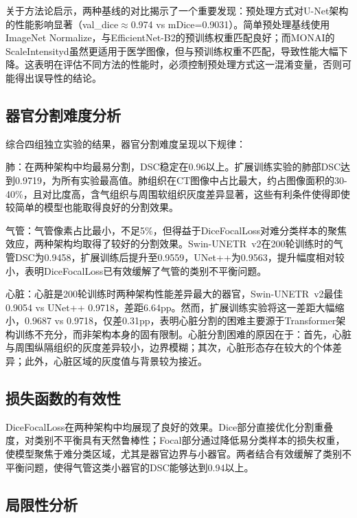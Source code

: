 \documentclass[12pt, a4paper]{article}
\begin{document}
关于方法论启示，两种基线的对比揭示了一个重要发现：预处理方式对U-Net架构的性能影响显著（val\_dice$\approx$0.974 vs mDice=0.9031）。简单预处理基线使用ImageNet Normalize，与EfficientNet-B2的预训练权重匹配良好；而MONAI的ScaleIntensityd虽然更适用于医学图像，但与预训练权重不匹配，导致性能大幅下降。这表明在评估不同方法的性能时，必须控制预处理方式这一混淆变量，否则可能得出误导性的结论。

\subsection{器官分割难度分析}

综合四组独立实验的结果，器官分割难度呈现以下规律：

肺：在两种架构中均最易分割，DSC稳定在0.96以上。扩展训练实验的肺部DSC达到0.9719，为所有实验最高值。肺组织在CT图像中占比最大，约占图像面积的30-40\%，且对比度高，含气组织与周围软组织灰度差异显著，这些有利条件使得即使较简单的模型也能取得良好的分割效果。

气管：气管像素占比最小，不足5\%，但得益于DiceFocalLoss对难分类样本的聚焦效应，两种架构均取得了较好的分割效果。Swin-UNETR~v2在200轮训练时的气管DSC为0.9458，扩展训练后提升至0.9559，UNet++为0.9563，提升幅度相对较小，表明DiceFocalLoss已有效缓解了气管的类别不平衡问题。

心脏：心脏是200轮训练时两种架构性能差异最大的器官，Swin-UNETR~v2最佳0.9054 vs UNet++ 0.9718，差距6.64pp。然而，扩展训练实验将这一差距大幅缩小，0.9687 vs 0.9718，仅差0.31pp，表明心脏分割的困难主要源于Transformer架构训练不充分，而非架构本身的固有限制。心脏分割困难的原因在于：首先，心脏与周围纵隔组织的灰度差异较小，边界模糊；其次，心脏形态存在较大的个体差异；此外，心脏区域的灰度值与背景较为接近。

\subsection{损失函数的有效性}

DiceFocalLoss在两种架构中均展现了良好的效果。Dice部分直接优化分割重叠度，对类别不平衡具有天然鲁棒性；Focal部分通过降低易分类样本的损失权重，使模型聚焦于难分类区域，尤其是器官边界与小器官。两者结合有效缓解了类别不平衡问题，使得气管这类小器官的DSC能够达到0.94以上。

\subsection{局限性分析}
\end{document}
